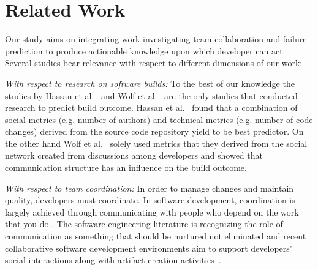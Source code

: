 \documentclass[12pt,oneside]{book}
\begin{document}


\section{Related Work}
\label{sec:relwork}
Our study aims on integrating work investigating team collaboration and failure prediction to produce actionable knowledge upon which developer can act.
Several studies bear relevance with respect to different dimensions of our work:

\emph{With respect to research on software builds:}
To the best of our knowledge the studies by Hassan et al.~\cite{hassan:ase:2006}
and Wolf et al.~\cite{wolf:icse:2009} are the only studies that conducted
research to predict build outcome. Hassan et al.~\cite{hassan:ase:2006} found
that a combination of social metrics (e.g. number of authors) and technical
metrics (e.g. number of code changes) derived from the source code repository
yield to be best predictor. On the other hand Wolf et al.~\cite{wolf:icse:2009}
solely used metrics that they derived from the social network created from
discussions among developers and showed that communication structure has an
influence on the build outcome.

\emph{With respect to team coordination:}
In
order to manage changes and maintain quality, developers must coordinate. In
software development, coordination is largely achieved through communicating with
people who depend on the work that you do \cite{kraut:1995coordination}. The
software engineering literature is recognizing the role of communication as
something that should be nurtured not eliminated and recent
collaborative software development environments aim to support developers'
social interactions along with artifact creation activities~\cite{nakakoji2010:rdc}.

\end{document}
